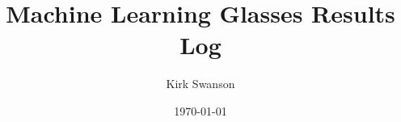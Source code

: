\documentclass[12pt,reqno]{amsart}
\numberwithin{equation}{section}
\begin{document}
\title{Machine Learning Glasses Results Log}
\author{Kirk Swanson}
\address{Institute for Molecular Engineering, University of Chicago, 5640 S Ellis Ave, Chicago, IL 60637}
\date{\today}




\maketitle


\normalsize


\end{document}
